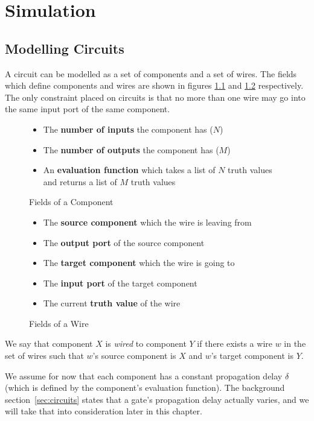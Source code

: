 \chapter{Simulation}
\label{chapter:simulation}

\section{Modelling Circuits}
A circuit can be modelled as a set of components and a set of wires. The fields which define components and wires are shown in figures \ref{fig:component} and \ref{fig:wire} respectively. The only constraint placed on circuits is that no more than one wire may go into the same input port of the same component.

\begin{figure}[H]
\centering
\begin{itemize}
	\item The \textbf{number of inputs} the component has ($N$)
	\item The \textbf{number of outputs} the component has ($M$)
	\item An \textbf{evaluation function} which takes a list of $N$ truth values and returns a list  of $M$ truth values
\end{itemize}
\caption{Fields of a Component}
\label{fig:component}
\end{figure}

\begin{figure}[H]
\centering
\begin{itemize}
	\item The \textbf{source component} which  the wire is leaving from
	\item The \textbf{output port} of the source component
	\item The \textbf{target component} which the wire is going to
	\item The \textbf{input port} of the target component
	\item The current \textbf{truth value} of the wire 
\end{itemize}
\caption{Fields of a Wire}
\label{fig:wire}
\end{figure}

We say that component $X$ is \textit{wired} to component $Y$ if there exists a wire $w$ in the set of wires such that $w$'s source component is $X$ and $w$'s target component is $Y$.

We assume for now that each component has a constant propagation delay $\delta$ (which is defined by the component's evaluation function). The background section~\ref{sec:circuits} states that a gate's propagation delay actually varies, and we will take that into consideration later in this chapter.

